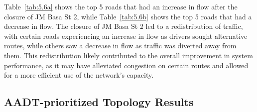 \begin{table}[H]
    \centering
    \renewcommand{\thetable}{5.6b}
    \caption{Top 5 Roads With Decrease in Flow After Closure of JM Basa St 2}
    \label{tab:5.6b}
\end{table}

Table~\ref{tab:5.6a} shows the top 5 roads that had an increase in flow after the closure of JM Basa St 2, while Table~\ref{tab:5.6b} shows the top 5 roads that had a decrease in flow. The closure of JM Basa St 2 led to a redistribution of traffic, with certain roads experiencing an increase in flow as drivers sought alternative routes, while others saw a decrease in flow as traffic was diverted away from them. This redistribution likely contributed to the overall improvement in system performance, as it may have alleviated congestion on certain routes and allowed for a more efficient use of the network's capacity.

\subsection{AADT-prioritized Topology Results}
\label{sec:aadt-prioritized}

